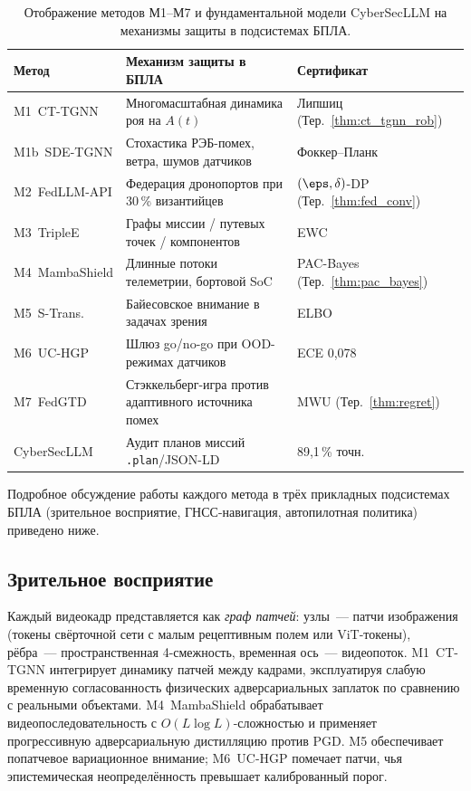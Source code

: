 \begin{table}[H]
\centering
\caption{Отображение методов \textsf{М1}--\textsf{М7} и фундаментальной
модели \textsf{CyberSecLLM} на механизмы защиты в подсистемах БПЛА.}
\label{tab:uav_mapping}
\small
\setlength{\tabcolsep}{4pt}
\renewcommand{\arraystretch}{1.2}
\begin{tabularx}{\linewidth}{@{}lXl@{}}
\toprule
\textbf{Метод} & \textbf{Механизм защиты в БПЛА} & \textbf{Сертификат}\\
\midrule
\textsf{M1~CT-TGNN}    & Многомасштабная динамика роя на $A(t)$               & Липшиц (Тер.~\ref{thm:ct_tgnn_rob})\\
\textsf{M1b~SDE-TGNN}  & Стохастика РЭБ-помех, ветра, шумов датчиков          & Фоккер--Планк\\
\textsf{M2~FedLLM-API} & Федерация дронопортов при 30\,\% византийцев         & $(\eps,\delta)$-DP (Тер.~\ref{thm:fed_conv})\\
\textsf{M3~TripleE}    & Графы миссии / путевых точек / компонентов           & EWC\\
\textsf{M4~MambaShield}& Длинные потоки телеметрии, бортовой SoC              & PAC-Bayes (Тер.~\ref{thm:pac_bayes})\\
\textsf{M5~S-Trans.}   & Байесовское внимание в задачах зрения                & ELBO\\
\textsf{M6~UC-HGP}     & Шлюз go/no-go при OOD-режимах датчиков               & ECE 0,078\\
\textsf{M7~FedGTD}     & Стэккельберг-игра против адаптивного источника помех & MWU (Тер.~\ref{thm:regret})\\
\textsf{CyberSecLLM}   & Аудит планов миссий \texttt{.plan}/JSON-LD           & 89,1\,\% точн.\\
\bottomrule
\end{tabularx}
\end{table}

Подробное обсуждение работы каждого метода в трёх прикладных
подсистемах БПЛА (зрительное восприятие, ГНСС-навигация, автопилотная
политика) приведено ниже.

\subsection{Зрительное восприятие}
\label{sec:uav_vision}

Каждый видеокадр представляется как \emph{граф патчей}: узлы~--- патчи
изображения (токены свёрточной сети с малым рецептивным полем или
ViT-токены), рёбра~--- пространственная 4-смежность, временная ось~---
видеопоток. \textsf{M1~CT-TGNN} интегрирует динамику патчей между
кадрами, эксплуатируя слабую временную согласованность физических
адверсариальных заплаток по сравнению с реальными объектами.
\textsf{M4~MambaShield} обрабатывает видеопоследовательность с
$O(L\log L)$-сложностью и применяет прогрессивную адверсариальную
дистилляцию против PGD. \textsf{M5} обеспечивает попатчевое
вариационное внимание; \textsf{M6~UC-HGP} помечает патчи, чья
эпистемическая неопределённость превышает калиброванный порог.


